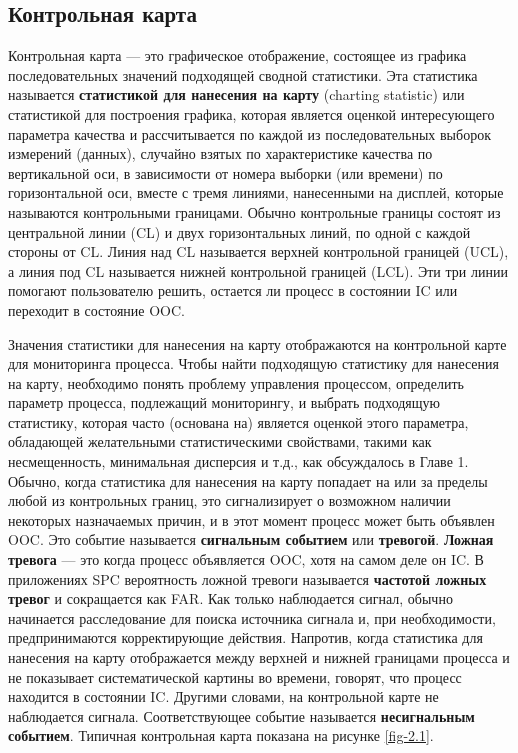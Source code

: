 \subsection{Контрольная карта}
Контрольная карта — это графическое отображение, состоящее из графика последовательных значений подходящей сводной статистики. Эта статистика называется \textbf{статистикой для нанесения на карту} (charting statistic) или статистикой для построения графика, которая является оценкой интересующего параметра качества и рассчитывается по каждой из последовательных выборок измерений (данных), случайно взятых по характеристике качества по вертикальной оси, в зависимости от номера выборки (или времени) по горизонтальной оси, вместе с тремя линиями, нанесенными на дисплей, которые называются контрольными границами. Обычно контрольные границы состоят из центральной линии (CL) и двух горизонтальных линий, по одной с каждой стороны от CL. Линия над CL называется верхней контрольной границей (UCL), а линия под CL называется нижней контрольной границей (LCL). Эти три линии помогают пользователю решить, остается ли процесс в состоянии IC или переходит в состояние OOC.

Значения статистики для нанесения на карту отображаются на контрольной карте для мониторинга процесса. Чтобы найти подходящую статистику для нанесения на карту, необходимо понять проблему управления процессом, определить параметр процесса, подлежащий мониторингу, и выбрать подходящую статистику, которая часто (основана на) является оценкой этого параметра, обладающей желательными статистическими свойствами, такими как несмещенность, минимальная дисперсия и т.д., как обсуждалось в Главе 1. Обычно, когда статистика для нанесения на карту попадает на или за пределы любой из контрольных границ, это сигнализирует о возможном наличии некоторых назначаемых причин, и в этот момент процесс может быть объявлен OOC. Это событие называется \textbf{сигнальным событием} или \textbf{тревогой}. \textbf{Ложная тревога} — это когда процесс объявляется OOC, хотя на самом деле он IC. В приложениях SPC вероятность ложной тревоги называется \textbf{частотой ложных тревог} и сокращается как FAR. Как только наблюдается сигнал, обычно начинается расследование для поиска источника сигнала и, при необходимости, предпринимаются корректирующие действия. Напротив, когда статистика для нанесения на карту отображается между верхней и нижней границами процесса и не показывает систематической картины во времени, говорят, что процесс находится в состоянии IC. Другими словами, на контрольной карте не наблюдается сигнала. Соответствующее событие называется \textbf{несигнальным событием}. Типичная контрольная карта показана на рисунке \ref{fig-2.1}.

